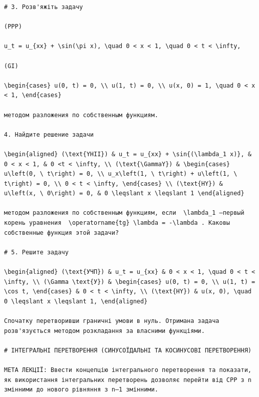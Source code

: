 \documentclass[
  ukrainian,
]{article}
\begin{document}
\begin{verbatim}
# 3. Розв'яжіть задачу

(PPP)

u_t = u_{xx} + \sin(\pi x), \quad 0 < x < 1, \quad 0 < t < \infty,

(GI)

\begin{cases} u(0, t) = 0, \\ u(1, t) = 0, \\ u(x, 0) = 1, \quad 0 < x < 1, \end{cases}

методом разложения по собственным функциям.

4. Найдите решение задачи

\begin{aligned} (\text{YHII}) & u_t = u_{xx} + \sin{(\lambda_1 x)}, & 0 < x < 1, & 0 <t < \infty, \\ (\text{\GammaY}) & \begin{cases} u\left(0, \ t\right) = 0, \\ u_x\left(1, \ t\right) + u\left(1, \ t\right) = 0, \\ 0 < t < \infty, \end{cases} \\ (\text{HY}) & u\left(x, \ 0\right) = 0, & 0 \leqslant x \leqslant 1 \end{aligned}

методом разложения по собственным функциям, если  \lambda_1 —первый корень уравнения  \operatorname{tg} \lambda = -\lambda . Каковы собственные функция этой задачи?

# 5. Решите задачу

\begin{aligned} (\text{УЧП}) & u_t = u_{xx} & 0 < x < 1, \quad 0 < t < \infty, \\ (\Gamma \text{У}) & \begin{cases} u(0, t) = 0, \\ u(1, t) = \cos t, \end{cases} & 0 < t < \infty, \\ (\text{HY}) & u(x, 0), \quad 0 \leqslant x \leqslant 1, \end{aligned}

Спочатку перетворивши граничні умови в нуль. Отримана задача розв'язується методом розкладання за власними функціями.

# ІНТЕГРАЛЬНІ ПЕРЕТВОРЕННЯ (СИНУСОЇДАЛЬНІ ТА КОСИНУСОВІ ПЕРЕТВОРЕННЯ)

МЕТА ЛЕКЦІЇ: Ввести концепцію інтегрального перетворення та показати, як використання інтегральних перетворень дозволяє перейти від CPP з n змінними до нового рівняння з n—1 змінними.


\end{verbatim}
\end{document}
